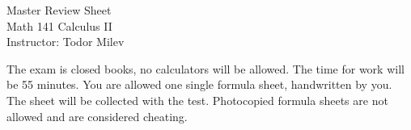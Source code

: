 \documentclass{article}
\begin{document}
\begin{center}
\Large
Master Review Sheet \\ Math 141 Calculus II \\ \normalsize Instructor: Todor Milev
\end{center}


\noindent The exam is closed books, no calculators will be allowed. The time for work will be 55 minutes. You are allowed one single formula sheet, handwritten by you. The sheet will be collected with the test. Photocopied formula sheets are not allowed and are considered cheating. 
\end{document}
